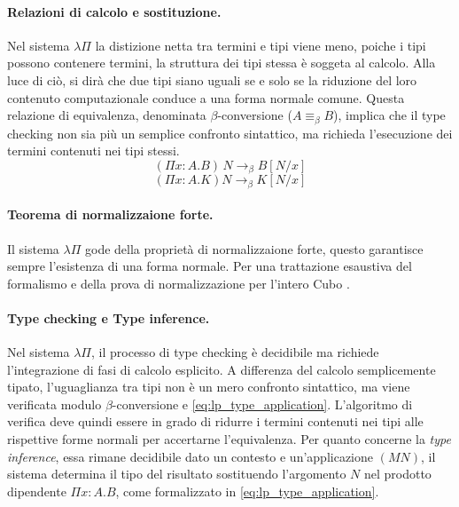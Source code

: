 \paragraph{Relazioni di calcolo e sostituzione.}
Nel sistema $\lambda \Pi$ la distizione netta tra termini e tipi viene meno, poiche i tipi possono contenere termini, la struttura dei tipi stessa è soggeta al calcolo. 
Alla luce di ciò, si dirà che due tipi siano uguali se e solo se la riduzione del loro contenuto computazionale conduce a una forma normale comune. 
Questa relazione di equivalenza, denominata $\beta$-conversione ($A \equiv_\beta B$), implica che il type checking non sia più un semplice confronto sintattico, 
ma richieda l'esecuzione dei termini contenuti nei tipi stessi.
\begin{equation}
    (\Pi x : A. B) \, N \to_\beta B[N/x]
    \label{eq:lp_type_application}
\end{equation}
\begin{equation}
    (\Pi x : A. K) N \to_\beta K[N/x]
    \label{eq:lp_kind_application}
\end{equation}

\paragraph{Teorema di normalizzaione forte.}
Il sistema $\lambda \Pi$ gode della proprietà di normalizzaione forte, questo garantisce sempre l'esistenza di una forma normale.
Per una trattazione esaustiva del formalismo e della prova di normalizzazione per l'intero Cubo \cite{barendregt1992}.

\paragraph{Type checking e Type inference.}
Nel sistema $\lambda \Pi$, il processo di type checking è decidibile ma richiede l'integrazione di fasi di calcolo esplicito. A differenza del calcolo semplicemente tipato, l'uguaglianza 
tra tipi non è un mero confronto sintattico, ma viene verificata modulo $\beta$-conversione e  \eqref{eq:lp_type_application}. L'algoritmo di verifica deve quindi 
essere in grado di ridurre i termini contenuti nei tipi alle rispettive forme normali per accertarne l'equivalenza. Per quanto concerne la \textit{type inference}, essa rimane decidibile dato un 
contesto e un'applicazione $(M N)$, il sistema determina il tipo del risultato sostituendo l'argomento $N$ nel prodotto dipendente $\Pi x:A. B$, come formalizzato in \eqref{eq:lp_type_application}.

